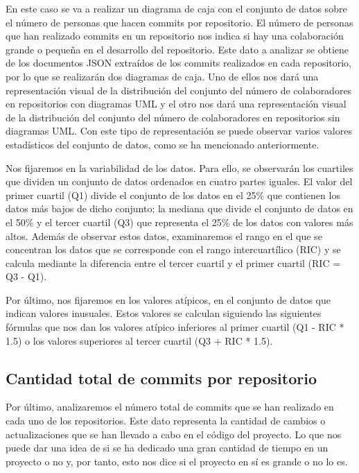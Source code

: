 \documentclass[a4paper, 12pt]{book}
\begin{document}
En este caso se va a realizar un diagrama de caja con el conjunto de datos sobre el número de personas que hacen commits por repositorio.
El número de personas que han realizado commits en un repositorio nos indica si hay una colaboración grande o pequeña en el desarrollo del repositorio.
Este dato a analizar se obtiene de los documentos JSON extraídos de los commits realizados en cada repositorio, por lo que se realizarán dos diagramas de caja.
Uno de ellos nos dará una representación visual de la distribución del conjunto del número de colaboradores en repositorios con diagramas UML y el otro nos dará una representación visual de la distribución del conjunto del número de colaboradores en repositorios sin diagramas UML.
Con este tipo de representación se puede observar varios valores estadísticos del conjunto de datos, como se ha mencionado anteriormente.


Nos fijaremos en la variabilidad de los datos. Para ello, se observarán los cuartiles que dividen un conjunto de datos ordenados en cuatro partes iguales.
El valor del primer cuartil (Q1) divide el conjunto de los datos en el 25\% que contienen los datos más bajos de dicho conjunto; la mediana que divide el conjunto de datos en el 50\% y el tercer cuartil (Q3) que representa el 25\% de los datos con valores más altos.
Además de observar estos datos, examinaremos el rango en el que se concentran los datos que se corresponde con el rango intercuartílico (RIC) y se calcula mediante la diferencia entre el tercer cuartil y el primer cuartil (RIC = Q3 - Q1).


Por último, nos fijaremos en los valores atípicos, en el conjunto de datos que indican valores inusuales.
Estos valores se calculan siguiendo las siguientes fórmulas que nos dan los valores atípico inferiores al primer cuartil (Q1 - RIC * 1.5)  o los valores superiores al tercer cuartil (Q3 + RIC * 1.5). 



\subsection{Cantidad total de commits por repositorio} %
\label{sec:cantidad total de commits por repositorio}

Por último, analizaremos el número total de commits que se han realizado en cada uno de los repositorios.
Este dato representa la cantidad de cambios o actualizaciones que se han llevado a cabo en el código del proyecto.
Lo que nos puede dar una idea de si se ha dedicado una gran cantidad de tiempo en un proyecto o no y, por tanto, esto nos dice si el proyecto en sí es grande o no lo es. 
\end{document}
